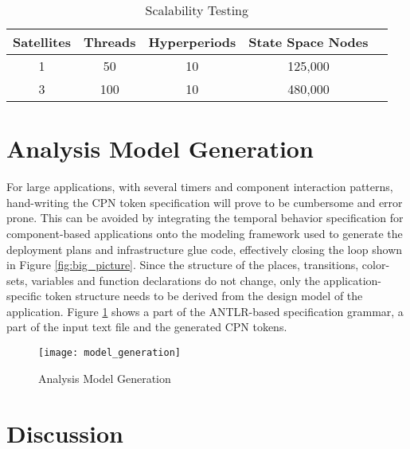 \begin{table}[htbp]
\centering
\caption{Scalability Testing}
\begin{tabular}{| c | c | c | c | p{1.3cm} |}
\hline
 Satellites & Threads & Hyperperiods & State Space Nodes \\\hline
1 & 50 & 10 & 125,000 \\\hline
3 & 100 & 10 & 480,000 \\\hline
\end{tabular}
\label{tbl:scalability}
\end{table}
\vspace{-0.1in}

\section{Analysis Model Generation}
\label{sec:Model_Generation}

For large applications, with several timers and component interaction patterns, hand-writing the CPN token specification will prove to be cumbersome and error prone. This can be avoided by integrating the temporal behavior specification for component-based applications onto the modeling framework used to generate the deployment plans and infrastructure glue code, effectively closing the loop shown in Figure \ref{fig:big_picture}. Since the structure of the places, transitions, color-sets, variables and function declarations do not change, only the application-specific token structure needs to be derived from the design model of the application. Figure \ref{fig:model_generation} shows a part of the ANTLR-based \cite{ANTLR_BOOK} specification grammar, a part of the input text file and the generated CPN tokens. 

\begin{figure}[ht] 
\centering
\texttt{[image: model\_generation]}
\caption{Analysis Model Generation}
\label{fig:model_generation}
\vspace{-0.2in}
\end{figure}

\section{Discussion}
\label{sec:Discussion}

